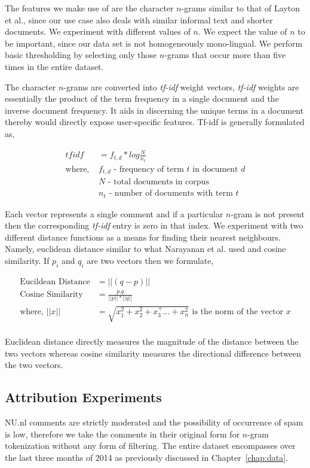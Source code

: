 The features we make use of are the character $n$-grams similar to that of Layton et al., since our use case also deals with similar informal text and shorter documents. We experiment with different values of $n$. We expect the value of $n$ to be important, since our data set is not homogeneously mono-lingual. We perform basic thresholding by selecting only those $n$-grams that occur more than five times in the entire dataset.

The character $n$-grams are converted into \textit{tf-idf} weight vectors, \textit{tf-idf} weights are essentially the product of the term frequency in a single document and the inverse document frequency. It aids in discerning the unique terms in a document thereby would directly expose user-specific features. Tf-idf is generally formulated as,

\begin{align*}
tfidf &= f_{t,d} * log\frac{N}{n_t}\\
\text{where, }& f_{t,d} \text{ - frequency of term $t$ in document $d$}\\
& N \text{ - total documents in corpus}\\
& n_t \text{ - number of documents with term $t$}
\end{align*}

Each vector represents a single comment and if a particular $n$-gram is not present then the corresponding \textit{tf-idf} entry is zero in that index. We experiment with two different distance functions as a means for finding their nearest neighbours. Namely, euclidean distance similar to what Narayanan et al. \cite{narayanan_feasibility_2012} used and cosine similarity. If $p_i$ and $q_i$ are two vectors then we formulate,

\begin{align*}
\text{Eucildean Distance} &= ||(q-p)||\\
\text{Cosine Similarity} &= \frac{p.q}{||p||*||q||}\\
\text{where, }||x|| &= \sqrt{x_1^2 + x_2^2 + x_3^ + ... + x_n^2} \text{ is the norm of the vector }x\\
\end{align*}

Euclidean distance directly measures the magnitude of the distance between the two vectors whereas cosine similarity measures the directional difference between the two vectors. 

\subsection{Attribution Experiments}
NU.nl comments are strictly moderated and the possibility of occurrence of spam is low, therefore we take the comments in their original form for $n$-gram tokenization without any form of filtering. The entire dataset encompasses over the last three months of 2014 as previously discussed in Chapter~\ref{chap:data}.

